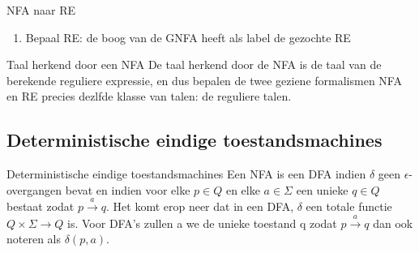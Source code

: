 \begin{alg}[NFA $\to$ RE]{NFA naar RE}
\begin{enumerate}
\begin{center}
                \end{center}
        \item Bepaal RE: de boog van de GNFA heeft als label de gezochte RE
    \end{enumerate}
\end{alg}

\begin{lem}{Taal herkend door een NFA}
    De taal herkend door de NFA is de taal van de berekende reguliere expressie, en dus bepalen de twee geziene formalismen NFA en RE precies dezlfde klasse van talen: de reguliere talen.
\end{lem}   

\subsection{Deterministische eindige toestandsmachines}

\vspace{0.5cm}

\begin{theo}{Deterministische eindige toestandsmachines}
    Een NFA is een DFA indien \(\delta\) geen \(\epsilon\)-overgangen bevat en 
    indien voor elke \(p \in Q\) en elke \(a \in \Sigma\) een unieke \(q \in Q\) 
    bestaat zodat \(p \overset{a}{\longrightarrow} q\). Het komt erop neer dat in een DFA, \(\delta\) 
    een totale functie $Q \times \Sigma \to Q$ is. Voor DFA's zullen a
    we de unieke toestand q zodat \(p \overset{a}{\longrightarrow} q\) dan ook noteren als \(\delta(p,a)\).
\end{theo}

\newpage


